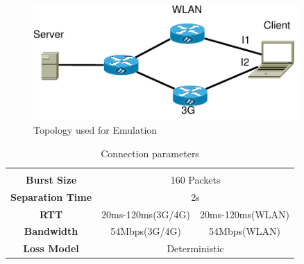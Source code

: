 \documentclass[12pt,draftcls,onecolumn]{IEEEtran}
\begin{document}
\begin{figure}[!ht]
\begin{center}
\includegraphics[angle=0, width=0.9\textwidth]{images/fortest.pdf}
\caption{Topology used for Emulation}\label{fig1}
\end{center}
\end{figure}
\begin{center}

\begin{table}
\begin{center}
\begin{tabular}{|c|cccccccccc|}
      \hline
      \multicolumn{1}{c}{} & & \\[\dimexpr-\normalbaselineskip-\arrayrulewidth]
      \textbf{Burst Size} & \multicolumn{10}{c|}{160 Packets} \\
      \hline
      \textbf{Separation Time} & \multicolumn{10}{c|}{2s} \\
      \hline

      \textbf{RTT} & \multicolumn{5}{c|}{20ms-120ms(3G/4G)} & \multicolumn{5}{c|}{20ms-120ms(WLAN)} \\
      \hline 	
      \textbf{Bandwidth} & \multicolumn{5}{c|}{54Mbps(3G/4G)} & \multicolumn{5}{c|}{54Mbps(WLAN)} \\
      \hline
      \textbf{Loss Model} & \multicolumn{10}{c|}{Deterministic}\\
      \hline
\end{tabular}
\caption{Connection parameters}\label{tab1}
\end{center}
\end{table}
\end{center}
\end{document}
